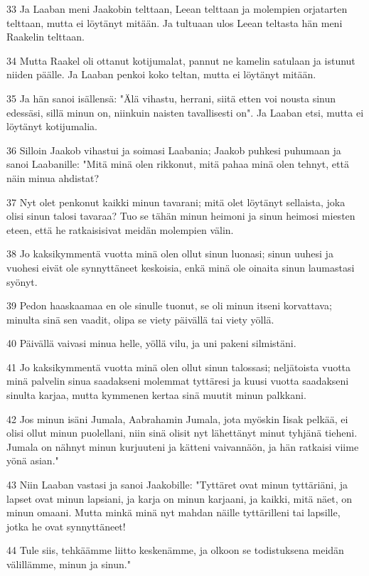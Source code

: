\par 33 Ja Laaban meni Jaakobin telttaan, Leean telttaan ja molempien orjatarten telttaan, mutta ei löytänyt mitään. Ja tultuaan ulos Leean teltasta hän meni Raakelin telttaan.
\par 34 Mutta Raakel oli ottanut kotijumalat, pannut ne kamelin satulaan ja istunut niiden päälle. Ja Laaban penkoi koko teltan, mutta ei löytänyt mitään.
\par 35 Ja hän sanoi isällensä: "Älä vihastu, herrani, siitä etten voi nousta sinun edessäsi, sillä minun on, niinkuin naisten tavallisesti on". Ja Laaban etsi, mutta ei löytänyt kotijumalia.
\par 36 Silloin Jaakob vihastui ja soimasi Laabania; Jaakob puhkesi puhumaan ja sanoi Laabanille: "Mitä minä olen rikkonut, mitä pahaa minä olen tehnyt, että näin minua ahdistat?
\par 37 Nyt olet penkonut kaikki minun tavarani; mitä olet löytänyt sellaista, joka olisi sinun talosi tavaraa? Tuo se tähän minun heimoni ja sinun heimosi miesten eteen, että he ratkaisisivat meidän molempien välin.
\par 38 Jo kaksikymmentä vuotta minä olen ollut sinun luonasi; sinun uuhesi ja vuohesi eivät ole synnyttäneet keskoisia, enkä minä ole oinaita sinun laumastasi syönyt.
\par 39 Pedon haaskaamaa en ole sinulle tuonut, se oli minun itseni korvattava; minulta sinä sen vaadit, olipa se viety päivällä tai viety yöllä.
\par 40 Päivällä vaivasi minua helle, yöllä vilu, ja uni pakeni silmistäni.
\par 41 Jo kaksikymmentä vuotta minä olen ollut sinun talossasi; neljätoista vuotta minä palvelin sinua saadakseni molemmat tyttäresi ja kuusi vuotta saadakseni sinulta karjaa, mutta kymmenen kertaa sinä muutit minun palkkani.
\par 42 Jos minun isäni Jumala, Aabrahamin Jumala, jota myöskin Iisak pelkää, ei olisi ollut minun puolellani, niin sinä olisit nyt lähettänyt minut tyhjänä tieheni. Jumala on nähnyt minun kurjuuteni ja kätteni vaivannäön, ja hän ratkaisi viime yönä asian."
\par 43 Niin Laaban vastasi ja sanoi Jaakobille: "Tyttäret ovat minun tyttäriäni, ja lapset ovat minun lapsiani, ja karja on minun karjaani, ja kaikki, mitä näet, on minun omaani. Mutta minkä minä nyt mahdan näille tyttärilleni tai lapsille, jotka he ovat synnyttäneet!
\par 44 Tule siis, tehkäämme liitto keskenämme, ja olkoon se todistuksena meidän välillämme, minun ja sinun."
